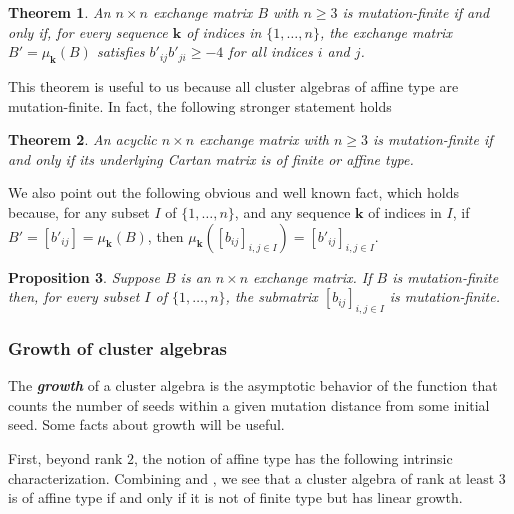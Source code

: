 \documentclass[10pt]{article}
\newtheorem{proposition}{Proposition}[section]
\newtheorem{theorem}[proposition]{Theorem}
\theoremstyle{definition}
\theoremstyle{remark}
\numberwithin{equation}{section}
\newcommand{\newword}[1]{\textbf{\emph{#1}}}
\newcommand{\set}[1]{{\lbrace #1 \rbrace}}
\newcommand{\0}{{\mathbf{0}}}
\newcommand{\kk}{{\boldsymbol{k}}}
\begin{document}
\begin{theorem}\label{mut fin 2x2}
An $n\times n$ exchange matrix $B$ with $n\ge3$ is mutation-finite if and only if, for every sequence $\kk$ of indices in $\set{1,\ldots,n}$, the exchange matrix $B'=\mu_\kk(B)$ satisfies $b'_{ij}b'_{ji}\ge-4$ for all indices $i$ and $j$.
\end{theorem}

This theorem is useful to us because all cluster algebras of affine type are mutation-finite.
In fact, the following stronger statement holds \cite[Theorem~3.5]{Seven} 

\begin{theorem}\label{acyc mut fin}
An acyclic $n\times n$ exchange matrix with $n\ge3$ is mutation-finite if and only if its underlying Cartan matrix is of finite or affine type.
\end{theorem}

We also point out the following obvious and well known fact, which holds because, for any subset $I$ of $\set{1,\ldots,n}$, and any sequence $\kk$ of indices in $I$, if $B'=[b'_{ij}]=\mu_\kk(B)$, then $\mu_\kk([b_{ij}]_{i,j\in I})=[b'_{ij}]_{i,j\in I}$.

\begin{proposition}\label{mut fin sub}
Suppose $B$ is an $n\times n$ exchange matrix.
If $B$ is mutation-finite then, for every subset $I$ of $\set{1,\ldots,n}$, the submatrix $[b_{ij}]_{i,j\in I}$ is mutation-finite.
\end{proposition}

\subsubsection{Growth of cluster algebras}\label{growth sec}
The \newword{growth} of a cluster algebra is the asymptotic behavior of the function that counts the number of seeds within a given mutation distance from some initial seed.
Some facts about growth will be useful.

First, beyond rank $2$, the notion of affine type has the following intrinsic characterization.
Combining \cite[Theorem~3.5]{Seven} and \cite[Theorem~1.1]{FeShThTu12}, we see that a cluster algebra of rank at least $3$ is of affine type if and only if it is not of finite type but has linear growth.
\end{document}
